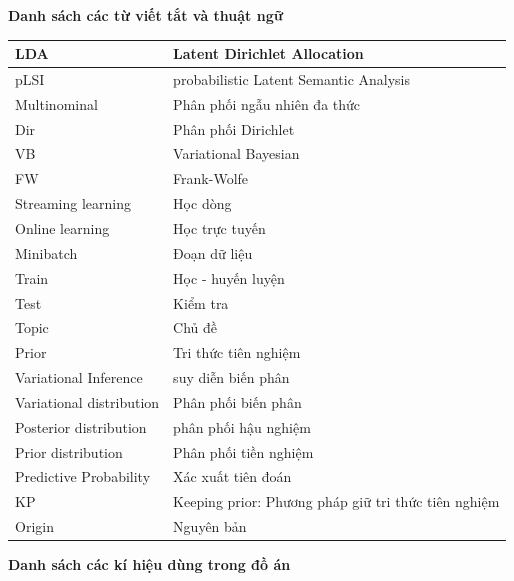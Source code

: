 \documentclass[fontsize=13pt]{scrartcl}
\begin{document}
\newpage
\textbf{Danh sách các từ viết tắt và thuật ngữ}

\begin{table}[H]
\begin{center}
\begin{tabular}{|l|l|}
\hline 
LDA & Latent Dirichlet Allocation \\
\hline 
pLSI & probabilistic Latent Semantic Analysis\\
\hline
Multinominal & Phân phối ngẫu nhiên đa thức\\
\hline
Dir & Phân phối Dirichlet \\
\hline
VB & Variational Bayesian \\
\hline
FW & Frank-Wolfe\\
\hline
Streaming learning & Học dòng\\
\hline
Online learning & Học trực tuyến\\
\hline 
Minibatch & Đoạn dữ liệu\\
\hline 
Train & Học - huyến luyện\\
\hline
Test & Kiểm tra\\
\hline
Topic & Chủ đề\\
\hline
Prior & Tri thức tiên nghiệm\\
\hline
Variational Inference & suy diễn biến phân \\
\hline
Variational distribution & Phân phối biến phân \\
\hline
Posterior distribution & phân phối hậu nghiệm \\
\hline
Prior distribution & Phân phối tiền nghiệm \\
\hline
Predictive Probability & Xác xuất tiên đoán\\
\hline
KP & Keeping prior: Phương pháp giữ tri thức tiên nghiệm\\
\hline
Origin & Nguyên bản\\

\hline 
\end{tabular}
\end{center}
\end{table}
\newpage
\textbf{Danh sách các kí hiệu dùng trong đồ án}
\end{document}

